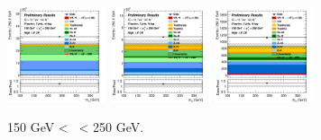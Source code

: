 \begin{figure}[h!]
    \centering
    \begin{subfigure}[b]{\textwidth}
        \centering
        \includegraphics[width=0.32\textwidth]{Images/VH/Own_fit/prefit_VHcc/Region_distmBB_BMax250_BMin150_DCRHigh_J3_TTypent_T1_L0_Y6051_Prefit.png}
        \includegraphics[width=0.32\textwidth]{Images/VH/Own_fit/prefit_VHcc/Region_distmBB_BMax250_BMin150_DCRHigh_J3_TTypelt_T2_L0_Y6051_Prefit.png}
        \includegraphics[width=0.32\textwidth]{Images/VH/Own_fit/prefit_VHcc/Region_distmBB_BMax250_BMin150_DCRHigh_J3_TTypett_T2_L0_Y6051_Prefit.png}
        \caption{150 GeV < \ptv\ < 250 GeV.}
        \label{fig:plots_VHcc_OL_150_CRH_2c_3J}
    \end{subfigure}
    \begin{subfigure}[b]{\textwidth}
        \centering


\end{subfigure}
\end{figure}
